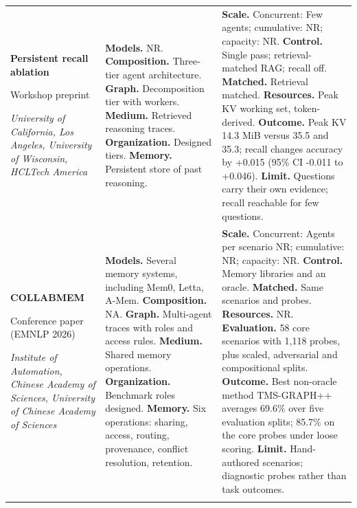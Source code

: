 \begin{longtable}{@{}>{\raggedright\arraybackslash}p{}>{\raggedright\arraybackslash}p{}>{\raggedright\arraybackslash}p{}@{}}
\textbf{Persistent recall ablation}\par \citep{persistent-memory-controlled-ablation}\par Workshop preprint\par\emph{University of California, Los Angeles, University of Wisconsin, HCLTech America} & \textbf{Models.} NR. \textbf{Composition.} Three-tier agent architecture. \textbf{Graph.} Decomposition tier with workers. \textbf{Medium.} Retrieved reasoning traces. \textbf{Organization.} Designed tiers. \textbf{Memory.} Persistent store of past reasoning. & \textbf{Scale.} Concurrent: Few agents; cumulative: NR; capacity: NR. \textbf{Control.} Single pass; retrieval-matched RAG; recall off. \textbf{Matched.} Retrieval matched. \textbf{Resources.} Peak KV working set, token-derived. \textbf{Outcome.} Peak KV 14.3 MiB versus 35.5 and 35.3; recall changes accuracy by +0.015 (95\% CI -0.011 to +0.046). \textbf{Limit.} Questions carry their own evidence; recall reachable for few questions. \\ \addlinespace[5pt]
\textbf{COLLABMEM}\par \citep{collabmem-2026}\par Conference paper (EMNLP 2026)\par\emph{Institute of Automation, Chinese Academy of Sciences, University of Chinese Academy of Sciences} & \textbf{Models.} Several memory systems, including Mem0, Letta, A-Mem. \textbf{Composition.} NA. \textbf{Graph.} Multi-agent traces with roles and access rules. \textbf{Medium.} Shared memory operations. \textbf{Organization.} Benchmark roles designed. \textbf{Memory.} Six operations: sharing, access, routing, provenance, conflict resolution, retention. & \textbf{Scale.} Concurrent: Agents per scenario NR; cumulative: NR; capacity: NR. \textbf{Control.} Memory libraries and an oracle. \textbf{Matched.} Same scenarios and probes. \textbf{Resources.} NR. \textbf{Evaluation.} 58 core scenarios with 1,118 probes, plus scaled, adversarial and compositional splits. \textbf{Outcome.} Best non-oracle method TMS-GRAPH++ averages 69.6\% over five evaluation splits; 85.7\% on the core probes under loose scoring. \textbf{Limit.} Hand-authored scenarios; diagnostic probes rather than task outcomes. \\ \addlinespace[5pt]

\end{longtable}
